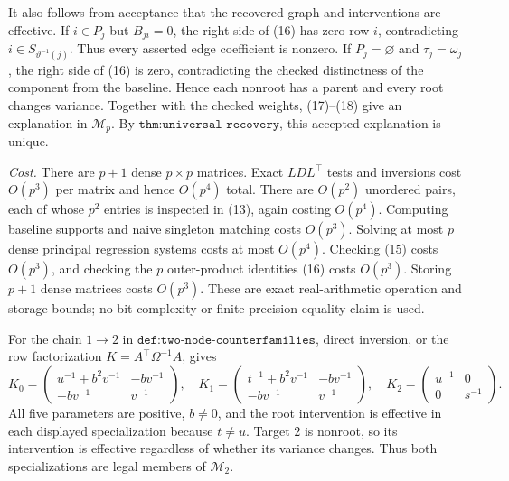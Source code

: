It also follows from acceptance that the recovered graph and interventions
are effective.  If \(i\in P_j\) but \(B_{ji}=0\), the right side of (16)
has zero row \(i\), contradicting \(i\in S_{\vartheta^{-1}(j)}\).
Thus every asserted edge coefficient is nonzero.  If \(P_j=\varnothing\)
and \(\tau_j=\omega_j\), the right side of (16) is zero, contradicting the
checked distinctness of the component from the baseline.  Hence each
nonroot has a parent and every root changes variance.  Together with the
checked weights, (17)--(18) give an explanation in \(\mathcal M_p\).
By \(\texttt{thm:universal-recovery}\), this accepted explanation is
unique.

\emph{Cost.}
There are \(p+1\) dense \(p\times p\) matrices.  Exact
\(LDL^{\top}\) tests and inversions cost \(O(p^3)\) per matrix and hence
\(O(p^4)\) total.  There are \(O(p^2)\) unordered pairs, each of whose
\(p^2\) entries is inspected in (13), again costing \(O(p^4)\).
Computing baseline supports and naive singleton matching costs \(O(p^3)\).
Solving at most \(p\) dense principal regression systems costs at most
\(O(p^4)\).  Checking (15) costs \(O(p^3)\), and checking the \(p\)
outer-product identities (16) costs \(O(p^3)\).  Storing \(p+1\) dense
matrices costs \(O(p^3)\).  These are exact real-arithmetic operation and
storage bounds; no bit-complexity or finite-precision equality claim is
used.

For the chain \(1\to2\) in
\(\texttt{def:two-node-counterfamilies}\), direct inversion, or the row
factorization \(K=A^{\top}\Omega^{-1}A\), gives
\[
 K_0=
 \begin{pmatrix}
 u^{-1}+b^2v^{-1}&-bv^{-1}\\
 -bv^{-1}&v^{-1}
 \end{pmatrix},\quad
 K_1=
 \begin{pmatrix}
 t^{-1}+b^2v^{-1}&-bv^{-1}\\
 -bv^{-1}&v^{-1}
 \end{pmatrix},\quad
 K_2=
 \begin{pmatrix}
 u^{-1}&0\\
 0&s^{-1}
 \end{pmatrix}.                                                    \tag{19}
\]
All five parameters are positive, \(b\neq0\), and the root intervention
is effective in each displayed specialization because \(t\neq u\).
Target \(2\) is nonroot, so its intervention is effective regardless of
whether its variance changes.  Thus both specializations are legal members
of \(\mathcal M_2\).

